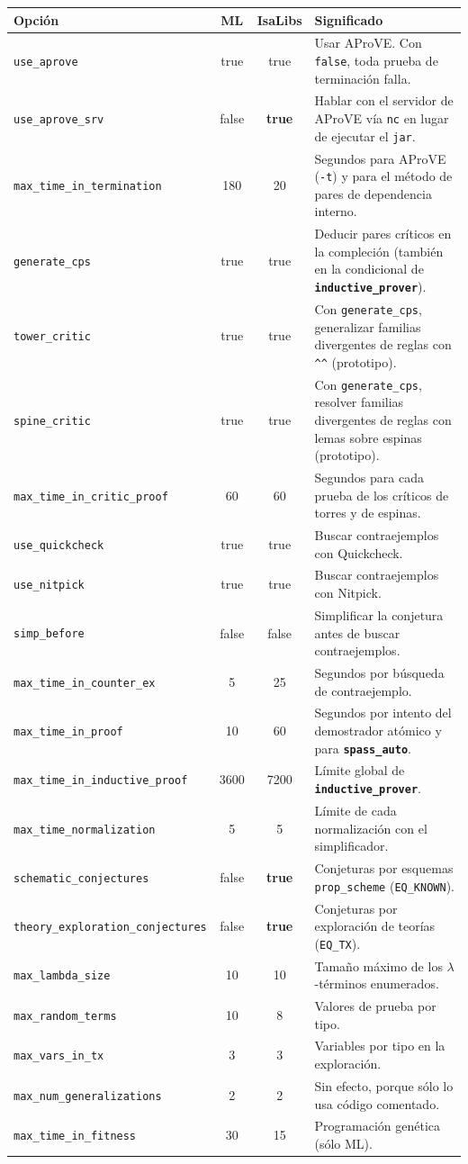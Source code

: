 \documentclass[11pt,a4paper]{article}
\newcommand{\isa}[1]{\texttt{#1}}
\newcommand{\cmd}[1]{\textbf{\texttt{#1}}}
\theoremstyle{definition}
\theoremstyle{remark}
\begin{document}
\begin{longtable}{@{}p{4.9cm}ccp{6.4cm}@{}}
\toprule
\textbf{Opción} & \textbf{ML} & \textbf{IsaLibs} & \textbf{Significado}\\
\midrule
\endhead
\isa{use\_aprove} & true & true & Usar AProVE. Con \isa{false}, toda prueba de terminación falla.\\
\isa{use\_aprove\_srv} & false & \textbf{true} & Hablar con el servidor de AProVE vía \isa{nc} en lugar de ejecutar el \isa{jar}.\\
\isa{max\_time\_in\_termination} & 180 & 20 & Segundos para AProVE (\isa{-t}) y para el método de pares de dependencia interno.\\
\isa{generate\_cps} & true & true & Deducir pares críticos en la compleción (también en la condicional de \cmd{inductive\_prover}).\\
\isa{tower\_critic} & true & true & Con \isa{generate\_cps}, generalizar familias divergentes de reglas con \isa{\textasciicircum\textasciicircum} (prototipo).\\
\isa{spine\_critic} & true & true & Con \isa{generate\_cps}, resolver familias divergentes de reglas con lemas sobre espinas (prototipo).\\
\isa{max\_time\_in\_critic\_proof} & 60 & 60 & Segundos para cada prueba de los críticos de torres y de espinas.\\
\isa{use\_quickcheck} & true & true & Buscar contraejemplos con Quickcheck.\\
\isa{use\_nitpick} & true & true & Buscar contraejemplos con Nitpick.\\
\isa{simp\_before} & false & false & Simplificar la conjetura antes de buscar contraejemplos.\\
\isa{max\_time\_in\_counter\_ex} & 5 & 25 & Segundos por búsqueda de contraejemplo.\\
\isa{max\_time\_in\_proof} & 10 & 60 & Segundos por intento del demostrador atómico y para \cmd{spass\_auto}.\\
\isa{max\_time\_in\_inductive\_proof} & 3600 & 7200 & Límite global de \cmd{inductive\_prover}.\\
\isa{max\_time\_normalization} & 5 & 5 & Límite de cada normalización con el simplificador.\\
\isa{schematic\_conjectures} & false & \textbf{true} & Conjeturas por esquemas \isa{prop\_scheme} (\isa{EQ\_KNOWN}).\\
\isa{theory\_exploration\_conjectures} & false & \textbf{true} & Conjeturas por exploración de teorías (\isa{EQ\_TX}).\\
\isa{max\_lambda\_size} & 10 & 10 & Tamaño máximo de los $\lambda$-términos enumerados.\\
\isa{max\_random\_terms} & 10 & 8 & Valores de prueba por tipo.\\
\isa{max\_vars\_in\_tx} & 3 & 3 & Variables por tipo en la exploración.\\
\isa{max\_num\_generalizations} & 2 & 2 & Sin efecto, porque sólo lo usa código comentado.\\
\isa{max\_time\_in\_fitness} & 30 & 15 & Programación genética (sólo ML).\\
\bottomrule
\end{longtable}
\end{document}
